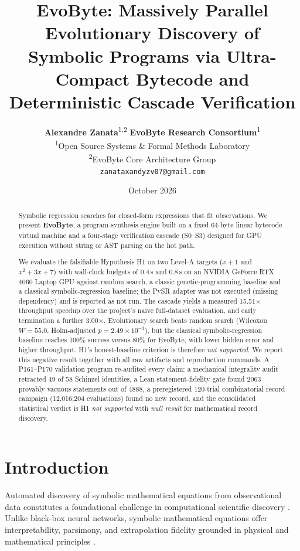 \documentclass[11pt,a4paper]{article}
\title{\textbf{EvoByte: Massively Parallel Evolutionary Discovery of Symbolic Programs via Ultra-Compact Bytecode and Deterministic Cascade Verification}}
\author{
  \textbf{Alexandre Zanata}\textsuperscript{1,2} \quad \textbf{EvoByte Research Consortium}\textsuperscript{1} \\
  \textsuperscript{1}Open Source Systems \& Formal Methods Laboratory \\
  \textsuperscript{2}EvoByte Core Architecture Group \\
  \texttt{zanataxandyzv07@gmail.com}
}
\date{October 2026}
\begin{document}
\maketitle

\begin{abstract}
Symbolic regression searches for closed-form expressions that fit observations. We present
\textbf{EvoByte}, a program-synthesis engine built on a fixed 64-byte linear bytecode virtual
machine and a four-stage verification cascade (S0--S3) designed for GPU execution without string
or AST parsing on the hot path.

We evaluate the falsifiable Hypothesis H1 on two Level-A targets ($x+1$ and $x^2+3x+7$) with
wall-clock budgets of 0.4\,s and 0.8\,s on an NVIDIA GeForce RTX 4060 Laptop GPU against random
search, a classic genetic-programming baseline and a classical symbolic-regression baseline; the
PySR adapter was not executed (missing dependency) and is reported as not run. The cascade yields
a measured 15.51$\times$ throughput speedup over the project's naive full-dataset evaluation, and
early termination a further 3.00$\times$. Evolutionary search beats random search (Wilcoxon
$W = 55.0$, Holm-adjusted $p = 2.49 \times 10^{-3}$), but the classical symbolic-regression
baseline reaches 100\% success versus 80\% for EvoByte, with lower hidden error and higher
throughput. H1's honest-baseline criterion is therefore \emph{not supported}. We report this
negative result together with all raw artifacts and reproduction commands. A P161--P170
validation program re-audited every claim: a mechanical integrality audit retracted 49 of 58
Schinzel identities, a Lean statement-fidelity gate found 2063 provably vacuous statements
out of 4888, a preregistered 120-trial combinatorial record campaign (12{,}016{,}204
evaluations) found no new record, and the consolidated statistical verdict is H1
\emph{not supported} with \emph{null result} for mathematical record discovery.
\end{abstract}

\section{Introduction}
Automated discovery of symbolic mathematical equations from observational data constitutes a foundational challenge in computational scientific discovery \cite{schmidt2009distilling, udrescu2020ai}. Unlike black-box neural networks, symbolic mathematical equations offer interpretability, parsimony, and extrapolation fidelity grounded in physical and mathematical principles \cite{cranmer2023interpretable}.
\end{document}
